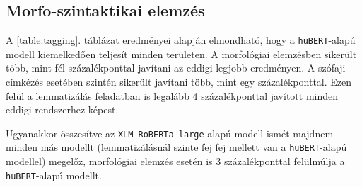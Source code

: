 \documentclass{llncs}
\newcommand{\hubert}{\texttt{huBERT}}
\newcommand{\robertaL}{\texttt{XLM-RoBERTa-large}}
\begin{document}
\subsection{Morfo-szintaktikai elemzés}

A \ref{table:tagging}. táblázat eredményei alapján elmondható, hogy a \hubert{}-alapú modell kiemelkedően teljesít minden területen. A morfológiai elemzésben sikerült több, mint fél százalékponttal javítani az eddigi legjobb eredményen. A szófaji címkézés esetében szintén sikerült javítani több, mint egy százalékponttal. Ezen felül a lemmatizálás feladatban is legalább 4 százalékponttal javított minden eddigi rendszerhez képest. 

Ugyanakkor összesítve az \robertaL{}-alapú modell ismét majdnem minden más modellt (lemmatizálásnál szinte fej fej mellett van a \hubert{}-alapú modellel) megelőz, morfológiai elemzés esetén is 3 százalékponttal felülmúlja a \hubert{}-alapú modellt.
\end{document}
